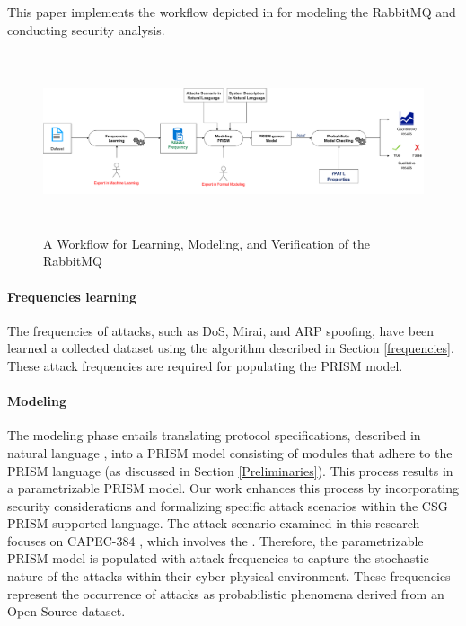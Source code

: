 This paper implements the workflow depicted in  for modeling the RabbitMQ  and conducting security analysis. 

\begin{figure}[h]
\noindent
     \centering
		\includegraphics[width=470pt, height =150pt]{flow.pdf}
		\caption{A Workflow for Learning, Modeling, and Verification of the RabbitMQ }
	\label{workflow}
\end{figure}



\paragraph{Frequencies learning} The frequencies of attacks, such as DoS, Mirai, and ARP spoofing, have been learned  a collected dataset using the algorithm described in Section \ref{frequencies}. These attack frequencies are required for populating the PRISM model.

\paragraph{Modeling} The modeling phase entails translating protocol specifications, described in natural language \cite{Rabbitmq}, into a PRISM model consisting of modules that adhere to the PRISM language (as discussed in Section \ref{Preliminaries}). This process results in a parametrizable PRISM model. Our work enhances this process by incorporating security considerations and formalizing specific attack scenarios within the CSG PRISM-supported language. The attack scenario examined in this research focuses on CAPEC-384 \cite{capec384}, which involves the . Therefore, the parametrizable PRISM model is populated with attack frequencies to capture the stochastic nature of the attacks within their cyber-physical environment. These frequencies represent the occurrence of attacks as probabilistic phenomena derived from an Open-Source dataset. 

